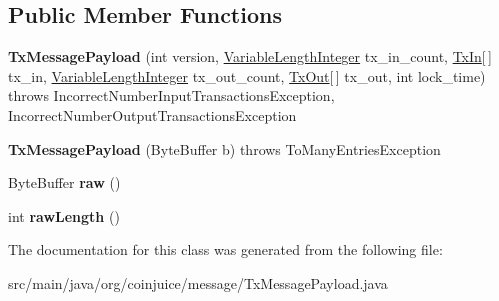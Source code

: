 \subsection*{Public Member Functions}
\begin{DoxyCompactItemize}
\item 
\hypertarget{classorg_1_1coinjuice_1_1message_1_1_tx_message_payload_ab5736e1dc4ea82b3cf523ec39414f540}{{\bfseries Tx\-Message\-Payload} (int version, \hyperlink{classorg_1_1coinjuice_1_1message_1_1field_1_1_variable_length_integer}{Variable\-Length\-Integer} tx\-\_\-in\-\_\-count, \hyperlink{classorg_1_1coinjuice_1_1message_1_1field_1_1_tx_in}{Tx\-In}\mbox{[}$\,$\mbox{]} tx\-\_\-in, \hyperlink{classorg_1_1coinjuice_1_1message_1_1field_1_1_variable_length_integer}{Variable\-Length\-Integer} tx\-\_\-out\-\_\-count, \hyperlink{classorg_1_1coinjuice_1_1message_1_1field_1_1_tx_out}{Tx\-Out}\mbox{[}$\,$\mbox{]} tx\-\_\-out, int lock\-\_\-time)  throws Incorrect\-Number\-Input\-Transactions\-Exception, Incorrect\-Number\-Output\-Transactions\-Exception }\label{classorg_1_1coinjuice_1_1message_1_1_tx_message_payload_ab5736e1dc4ea82b3cf523ec39414f540}

\item 
\hypertarget{classorg_1_1coinjuice_1_1message_1_1_tx_message_payload_a6a53028fac9725a098c971d7b26832de}{{\bfseries Tx\-Message\-Payload} (Byte\-Buffer b)  throws To\-Many\-Entries\-Exception }\label{classorg_1_1coinjuice_1_1message_1_1_tx_message_payload_a6a53028fac9725a098c971d7b26832de}

\item 
\hypertarget{classorg_1_1coinjuice_1_1message_1_1_tx_message_payload_af757c68e257d6f8e7c78443e11ad67b8}{Byte\-Buffer {\bfseries raw} ()}\label{classorg_1_1coinjuice_1_1message_1_1_tx_message_payload_af757c68e257d6f8e7c78443e11ad67b8}

\item 
\hypertarget{classorg_1_1coinjuice_1_1message_1_1_tx_message_payload_a639a161253eb62c88e7dc7f5d086a6b4}{int {\bfseries raw\-Length} ()}\label{classorg_1_1coinjuice_1_1message_1_1_tx_message_payload_a639a161253eb62c88e7dc7f5d086a6b4}

\end{DoxyCompactItemize}


The documentation for this class was generated from the following file\-:\begin{DoxyCompactItemize}
\item 
src/main/java/org/coinjuice/message/Tx\-Message\-Payload.\-java\end{DoxyCompactItemize}
